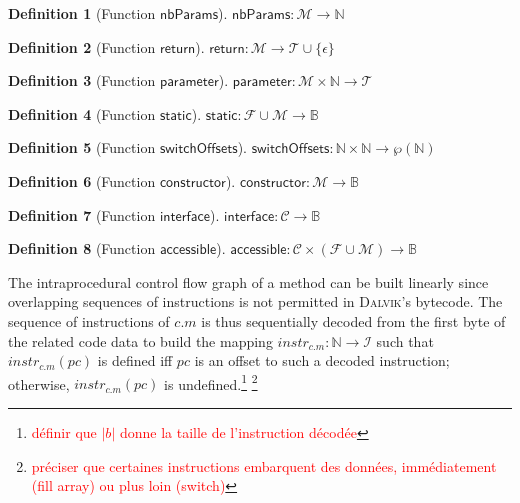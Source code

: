 \documentclass[english,dvips,ps2pdf,11pt]{article}
\let\powerset\wp
\theoremstyle{definition}
\newtheorem{definition}{Definition}[section]
\newcommand{\todo}[1]{\footnote{\textcolor{red}{#1}}}
\newcommand{\var}[1]{\ensuremath{\mathit{#1}}\xspace}
\newcommand{\func}[1]{\ensuremath{\mathsf{#1}}\xspace}
\newcommand{\dalvik}[0]{\textsc{Dalvik}\xspace}
\newcommand{\concretetypes}[0]{\ensuremath{\mathcal{T}}\xspace}
\newcommand{\classes}[0]{\ensuremath{\mathcal{C}}\xspace}
\newcommand{\fields}[0]{\ensuremath{\mathcal{F}}\xspace}
\newcommand{\methods}[0]{\ensuremath{\mathcal{M}}\xspace}
\newcommand{\instructions}[0]{\ensuremath{\mathcal{I}}\xspace}
\newcommand{\instruction}[1]{\ensuremath{\var{instr}_{#1}}\xspace}
\newcommand{\nbparams}[0]{\func{nbParams}}
\newcommand{\returnof}[0]{\func{return}}
\newcommand{\parameter}[0]{\func{parameter}}
\newcommand{\static}[0]{\func{static}}
\newcommand{\switchoffsets}[0]{\func{switchOffsets}}
\newcommand{\constructor}[0]{\func{constructor}}
\newcommand{\interface}[0]{\func{interface}}
\newcommand{\accessible}[0]{\func{accessible}}
\newcommand{\rvoid}[0]{\ensuremath{\epsilon}\xspace}
\begin{document}
\begin{definition}[Function \nbparams]
  $\nbparams : \methods \longrightarrow \mathbb{N}$
\end{definition}

\begin{definition}[Function \returnof]
  $\returnof : \methods \longrightarrow \concretetypes \cup \{\rvoid\}$
\end{definition}

\begin{definition}[Function \parameter]
  $\parameter : \methods \times \mathbb{N} \longrightarrow \concretetypes$
\end{definition}

\begin{definition}[Function \static]
  $\static : \fields \cup \methods \longrightarrow \mathbb{B}$
\end{definition}

\begin{definition}[Function \switchoffsets]
  $\switchoffsets : \mathbb{N} \times \mathbb{N} \longrightarrow \powerset(\mathbb{N})$
\end{definition}

\begin{definition}[Function \constructor]
  $\constructor : \methods \longrightarrow \mathbb{B}$
\end{definition}

\begin{definition}[Function \interface]
  $\interface : \classes \longrightarrow \mathbb{B}$
\end{definition}

\begin{definition}[Function \accessible]
  $\accessible : \classes \times (\fields \cup \methods) \longrightarrow \mathbb{B}$
\end{definition}




The intraprocedural control flow graph of a method can be built
linearly since overlapping sequences of instructions is not permitted
in \dalvik's bytecode. The sequence of instructions of $c.m$ is thus
sequentially decoded from the first byte of the related code data to
build the mapping $\instruction{c.m} : \mathbb{N} \longrightarrow
\instructions$ such that $\instruction{c.m}(\var{pc})$ is defined iff
\var{pc} is an offset to such a decoded instruction; otherwise,
$\instruction{c.m}(\var{pc})$ is undefined.\todo{définir que $|b|$ donne la taille de l'instruction décodée} \todo{préciser que certaines instructions embarquent des données, immédiatement (fill array) ou plus loin (switch)}
\end{document}
